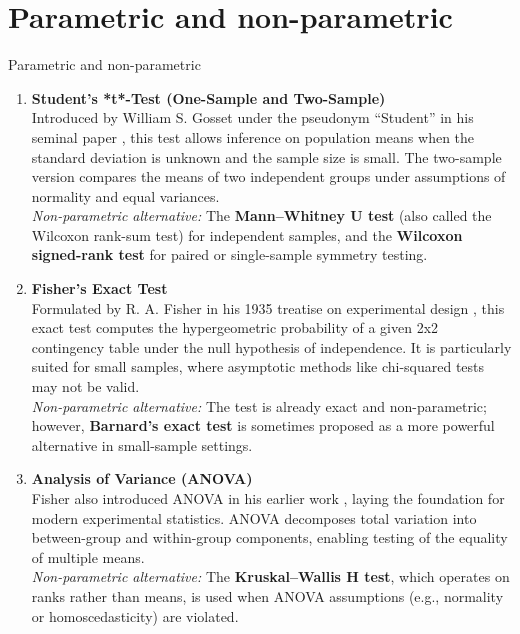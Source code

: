 \documentclass{book}
\begin{document}
\newpage

\section{Parametric and non-parametric}

Parametric and non-parametric

\begin{enumerate}

\item \textbf{Student’s *t*-Test (One-Sample and Two-Sample)}\\
Introduced by William S. Gosset under the pseudonym “Student” in his seminal paper \cite{student1908}, this test allows inference on population means when the standard deviation is unknown and the sample size is small. The two-sample version compares the means of two independent groups under assumptions of normality and equal variances.\\
\textit{Non-parametric alternative:} The \textbf{Mann–Whitney U test} (also called the Wilcoxon rank-sum test) for independent samples, and the \textbf{Wilcoxon signed-rank test} for paired or single-sample symmetry testing.

\item \textbf{Fisher’s Exact Test}\\
Formulated by R. A. Fisher in his 1935 treatise on experimental design \cite{fisher1935}, this exact test computes the hypergeometric probability of a given 2x2 contingency table under the null hypothesis of independence. It is particularly suited for small samples, where asymptotic methods like chi-squared tests may not be valid.\\
\textit{Non-parametric alternative:} The test is already exact and non-parametric; however, \textbf{Barnard’s exact test} is sometimes proposed as a more powerful alternative in small-sample settings.

\item \textbf{Analysis of Variance (ANOVA)}\\
Fisher also introduced ANOVA in his earlier work \cite{fisher1925}, laying the foundation for modern experimental statistics. ANOVA decomposes total variation into between-group and within-group components, enabling testing of the equality of multiple means.\\
\textit{Non-parametric alternative:} The \textbf{Kruskal–Wallis H test}, which operates on ranks rather than means, is used when ANOVA assumptions (e.g., normality or homoscedasticity) are violated.


\end{enumerate}
\end{document}
